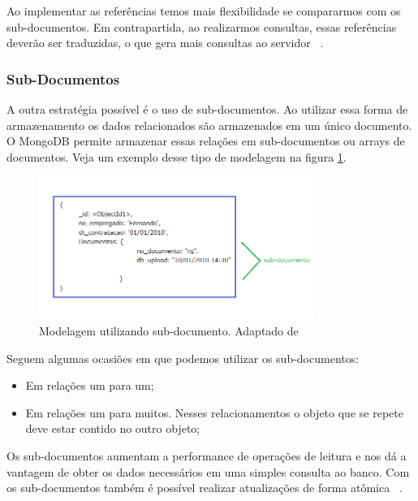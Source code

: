 Ao implementar as referências temos mais flexibilidade se compararmos com os sub-documentos. Em contrapartida, ao realizarmos consultas, essas referências deverão ser traduzidas, o que gera mais consultas ao servidor ~\cite{Orendanalysisand}.

\subsubsection{Sub-Documentos}

A outra estratégia possível é o uso de sub-documentos. Ao utilizar essa forma de armazenamento os dados relacionados são armazenados em um único documento. O MongoDB permite armazenar essas relações em sub-documentos ou arrays de documentos. Veja um exemplo desse tipo de modelagem na figura \ref{fig:subdocumento}.

	\begin{figure}[!htbp]
		\begin{center}
			\includegraphics[width=0.8\textwidth]{subdocumento}
		\end{center}
		\caption{ Modelagem utilizando sub-documento. Adaptado de ~\cite{sitemongodb}}
		\label{fig:subdocumento}
	\end{figure}

Seguem algumas ocasiões em que podemos utilizar os sub-documentos:

\begin{itemize}
	\item Em relações um para um;
	\item Em relações um para muitos. Nesses relacionamentos o objeto que se repete deve estar contido no outro objeto;
\end{itemize}

Os sub-documentos aumentam a performance de operações de leitura e nos dá a vantagem de obter os dados necessários em uma simples consulta ao banco. Com os sub-documentos também é possível realizar atualizações de forma atômica ~\cite{Orendanalysisand}.

